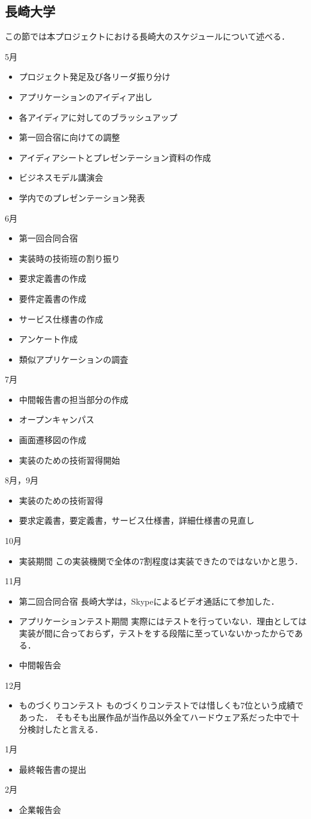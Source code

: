 \subsection{長崎大学}
\par
この節では本プロジェクトにおける長崎大のスケジュールについて述べる．
\par
5月
\begin{itemize}
\item プロジェクト発足及び各リーダ振り分け
\item アプリケーションのアイディア出し
\item 各アイディアに対してのブラッシュアップ
\item 第一回合宿に向けての調整
\item アイディアシートとプレゼンテーション資料の作成
\item ビジネスモデル講演会
\item 学内でのプレゼンテーション発表
\end{itemize}
6月
\begin{itemize}
\item 第一回合同合宿
\item 実装時の技術班の割り振り
\item 要求定義書の作成
\item 要件定義書の作成
\item サービス仕様書の作成
\item アンケート作成
\item 類似アプリケーションの調査
\end{itemize}
7月
\begin{itemize}
\item 中間報告書の担当部分の作成
\item オープンキャンパス
\item 画面遷移図の作成
\item 実装のための技術習得開始
\end{itemize}
8月，9月
\begin{itemize}
\item 実装のための技術習得
\item 要求定義書，要定義書，サービス仕様書，詳細仕様書の見直し
\end{itemize}
10月
\begin{itemize}
\item 実装期間
この実装機関で全体の7割程度は実装できたのではないかと思う．
\end{itemize}
11月
\begin{itemize}
\item 第二回合同合宿
長崎大学は，Skypeによるビデオ通話にて参加した．
\item アプリケーションテスト期間
実際にはテストを行っていない．理由としては実装が間に合っておらず，テストをする段階に至っていないかったからである．
\item 中間報告会
\end{itemize}
12月
\begin{itemize}
\item ものづくりコンテスト
ものづくりコンテストでは惜しくも7位という成績であった．
そもそも出展作品が当作品以外全てハードウェア系だった中で十分検討したと言える．
\end{itemize}
1月
\begin{itemize}
\item 最終報告書の提出
\end{itemize}
2月
\begin{itemize}
\item 企業報告会
\end{itemize}
